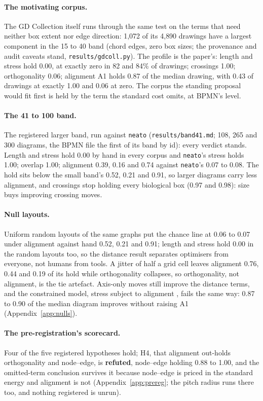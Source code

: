 \documentclass[a4paper,UKenglish]{gd-lipics-v3}
\begin{document}
\paragraph{The motivating corpus.} The GD Collection itself \cite{gdcoll25} runs through
the same test on the terms that need neither box extent nor edge direction: 1{,}072 of
its 4{,}890 drawings have a largest component in the 15 to 40 band
(chord edges, zero box sizes; the provenance and audit caveats stand,
\texttt{results/gdcoll.py}). The profile is the paper's: length and stress
hold 0.00, at exactly zero in 82 and 84\% of drawings; crossings 1.00; orthogonality
0.06; alignment A1 holds 0.87 of the median drawing, with 0.43 of drawings at exactly
1.00 and 0.06 at zero. The corpus the standing proposal would fit first is held by the
term the standard cost omits, at BPMN's level.

\paragraph{The 41 to 100 band.} The registered larger band, run against \texttt{neato}
(\texttt{results/band41.md}; 108, 265 and 300 diagrams, the BPMN file the first of
its band by id): every verdict stands.
Length and stress hold 0.00 by hand in every corpus and \texttt{neato}'s stress holds
1.00; overlap 1.00; alignment 0.39, 0.16 and 0.74 against \texttt{neato}'s 0.07 to 0.08.
The hold sits below the small band's 0.52, 0.21 and 0.91, so larger diagrams carry less
alignment, and crossings stop holding every biological box (0.97 and 0.98): size buys
improving crossing moves.

\paragraph{Null layouts.} Uniform random layouts of the same graphs put the chance line
at 0.06 to 0.07 under alignment against hand 0.52, 0.21 and 0.91; length and stress hold
0.00 in the random layouts too, so the distance result separates optimisers from
everyone, not humans from tools. A jitter of half a grid cell leaves alignment 0.76,
0.44 and 0.19 of its hold while orthogonality collapses, so orthogonality, not
alignment, is the tie artefact. Axis-only moves still improve the distance terms, and
the constrained model, stress subject to alignment \cite{ipsepcola06, dunnart08,
setcola18}, fails the same way: 0.87 to 0.90 of the median diagram improves without
raising A1 (Appendix~\ref{app:nulls}).

\paragraph{The pre-registration's scorecard.} Four of the five registered hypotheses
hold; H4, that alignment out-holds orthogonality and node--edge, is \textbf{refuted},
node--edge holding 0.88 to 1.00, and the omitted-term conclusion survives it because
node--edge is priced in the standard energy and alignment is not
(Appendix~\ref{app:prereg}; the pitch radius runs there too, and nothing
registered is unrun).
\end{document}
